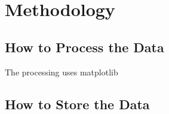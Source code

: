 \chapter{Methodology}\label{ch:methodology} %
\section{How to Process the Data} %
\label{sec:how_to_process_the_data}
The processing uses matplotlib\cite{Hunter:2007}


\section{How to Store the Data} %
\label{sec:how_to_store_the_data}

